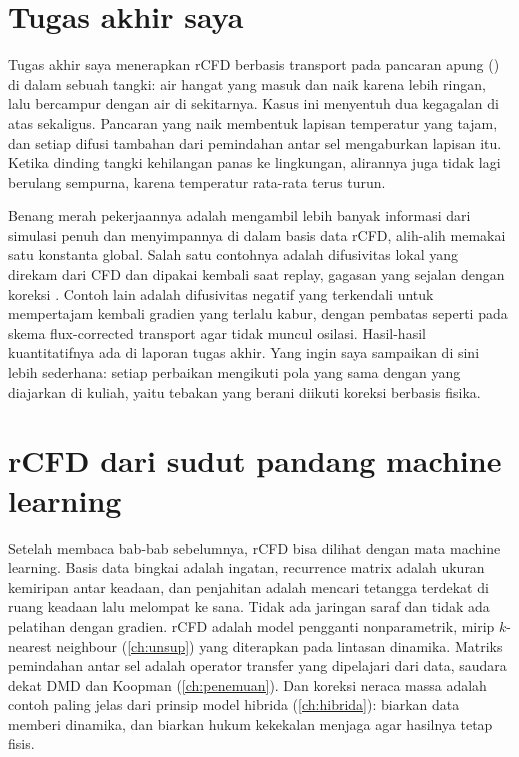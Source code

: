 \section{Tugas akhir saya}

Tugas akhir saya menerapkan rCFD berbasis transport pada pancaran apung () di dalam
sebuah tangki: air hangat yang masuk dan naik karena lebih ringan, lalu bercampur dengan air di
sekitarnya. Kasus ini menyentuh dua kegagalan di atas sekaligus. Pancaran yang naik membentuk lapisan
temperatur yang tajam, dan setiap difusi tambahan dari pemindahan antar sel mengaburkan lapisan itu.
Ketika dinding tangki kehilangan panas ke lingkungan, alirannya juga tidak lagi berulang sempurna,
karena temperatur rata-rata terus turun.

Benang merah pekerjaannya adalah mengambil lebih banyak informasi dari simulasi penuh dan menyimpannya
di dalam basis data rCFD, alih-alih memakai satu konstanta global. Salah satu contohnya adalah
difusivitas lokal yang direkam dari CFD dan dipakai kembali saat replay, gagasan yang sejalan dengan
koreksi \citet{du2020}. Contoh lain adalah difusivitas negatif yang terkendali untuk mempertajam kembali
gradien yang terlalu kabur, dengan pembatas seperti pada skema flux-corrected transport agar tidak
muncul osilasi. Hasil-hasil kuantitatifnya ada di laporan tugas akhir. Yang ingin saya sampaikan di sini
lebih sederhana: setiap perbaikan mengikuti pola yang sama dengan yang diajarkan di kuliah, yaitu tebakan
yang berani diikuti koreksi berbasis fisika.

\section{rCFD dari sudut pandang machine learning}

Setelah membaca bab-bab sebelumnya, rCFD bisa dilihat dengan mata machine learning. Basis data bingkai
adalah ingatan, recurrence matrix adalah ukuran kemiripan antar keadaan, dan penjahitan adalah mencari
tetangga terdekat di ruang keadaan lalu melompat ke sana. Tidak ada jaringan saraf dan tidak ada
pelatihan dengan gradien. rCFD adalah model pengganti nonparametrik, mirip $k$-nearest neighbour
(\cref{ch:unsup}) yang diterapkan pada lintasan dinamika. Matriks pemindahan antar sel adalah operator
transfer yang dipelajari dari data, saudara dekat DMD dan Koopman (\cref{ch:penemuan}). Dan koreksi neraca
massa adalah contoh paling jelas dari prinsip model hibrida (\cref{ch:hibrida}): biarkan data memberi
dinamika, dan biarkan hukum kekekalan menjaga agar hasilnya tetap fisis.

